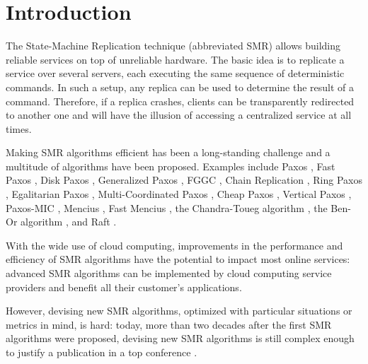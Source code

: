\section{Introduction}

The State-Machine Replication technique (abbreviated SMR) allows building
reliable services on top of unreliable hardware. The basic idea is to
replicate a service over several servers, each executing the same sequence of
deterministic commands. In such a setup, any replica can be used to determine
the result of a command. Therefore, if a replica crashes, clients can be
transparently redirected to another one and will have the illusion of accessing
a centralized service at all times.

Making SMR algorithms efficient has been a long-standing challenge
and a multitude of algorithms have been proposed. Examples include
Paxos \cite{lamport2001paxos}, Fast Paxos \cite{Lamport06FastPaxos},
Disk Paxos \cite{GafniLamport03DiskPaxos}, Generalized Paxos \cite{Lamport05GeneralizeConsensus}, FGGC \cite{SutraShapiro11FastGenuineGeneralizedConsensus}, Chain Replication
\cite{RenesseSchneider04ChainReplicationSupportingHighThroughputAvailability},
Ring Paxos \cite{MarandiETAL10RingPaxosHighthroughputAtomicBroadcastProtocol},
Egalitarian Paxos
\cite{MoraruAndersenKaminsky13ThereIsMoreConsensusEgalitarianParliaments},
Multi-Coordinated Paxos \cite{CamargosSchmidtPedone07MulticoordinatedPaxos},
Cheap Paxos \cite{LamportMassa04CheapPaxos}, Vertical Paxos
\cite{LamportMalkhiZhou09VerticalPaxosPrimarybackupReplication}, Paxos-MIC
\cite{HurfinMoiseNarzul11AdaptiveFastPaxosMakingQuickEverlasting}, Mencius
\cite{MaoJunqueiraMarzullo08MenciusBuildingEfficientReplicatedStateMachine},
Fast Mencius \cite{WeiETAL13FastMenciusMenciusLowCommitLatency},
the Chandra-Toueg algorithm
\cite{ChandraToueg96UnreliableFailureDetectorsReliableDistributedSystems}, the
Ben-Or algorithm \cite{BenOr83AnotherAdvantageFreeChoiceCompletelyAsynchronous},
and Raft \cite{OngaroOusterhout14SearchUnderstandableConsensusAlgorithm}.

With the wide use of cloud computing, improvements in the performance and
efficiency of SMR algorithms have the potential to impact most online services:
advanced SMR algorithms can be implemented by cloud computing service providers
and benefit all their customer's applications.

However, devising new SMR algorithms, optimized with
particular situations or metrics in mind, is hard: today,
more than two decades after the first SMR algorithms
\cite{Lamport98ParttimeParliament,BirmanJoseph87ReliableCommunicationPresenceFailures,OkiLiskov88ViewstampedReplicationGeneralPrimaryCopy,DworkLynchStockmeyer84ConsensusPresencePartialSynchronyPreliminaryVersion} were proposed, devising new
SMR algorithms is still complex enough to justify a publication in a top conference
\cite{MoraruAndersenKaminsky13ThereIsMoreConsensusEgalitarianParliaments,OngaroOusterhout14SearchUnderstandableConsensusAlgorithm}.

